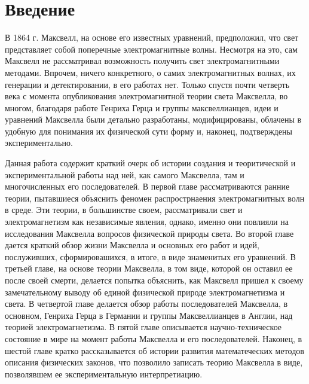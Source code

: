 \documentclass[12pt, oneside, a4paper]{article}
\begin{document}
\tableofcontents
\newpage
\section{Введение}
В 1864 г. Максвелл, на основе его известных уравнений, предположил, что свет представляет собой поперечные электромагнитные волны. Несмотря на это, сам Максвелл не рассматривал возможность получить свет электромагнитными методами. Впрочем, ничего конкретного, о самих электромагнитных волнах, их генерации и детектировании, в его работах нет. Только спустя почти четверть века с момента опубликования электромагнитной теории света Максвелла, во многом, благодаря работе Генриха Герца и группы максвеллианцев, идеи и уравнений Максвелла были детально разработаны, модифицированы, облачены в удобную для понимания их физической сути форму и, наконец, подтверждены экспериментально.

Данная работа содержит краткий очерк об истории создания и теоритической и экспериментальной работы над ней, как самого Максвелла, там и многочисленных его последователей. В первой главе рассматриваются ранние теории, пытавшиеся объяснить феномен распрострнаения электромагнитных волн в среде. Эти теории, в большинстве своем, рассматривали свет и электромагнетизм как независимые явления, однако, именно они повлияли на исследования Максвелла вопросов физической природы света. Во второй главе дается краткий обзор жизни Максвелла и основных его работ и идей, послуживших, сформировашихся, в итоге, в виде знаменитых его уравнений. В третьей главе, на основе теории Максвелла, в том виде, которой он оставил ее после своей смерти, делается попытка объяснить, как Максвелл пришел к своему замечательному выводу об единой физической природе электромагнетизма и света. В четвертой главе делается обзор работы последователей Максвелла, в основном, Генриха Герца в Германии и группы Максвеллианцев в Англии, над теорией электромагнетизма. В пятой главе описывается научно-техническое состояние в мире на момент работы Максвелла и его последователей. Наконец, в шестой главе кратко  рассказывается об истории развития математеческих методов описания физических законов, что позволило записать теорию Максвелла в виде, позволявшем ее экспериментальную интерпретиацию.
\end{document}
